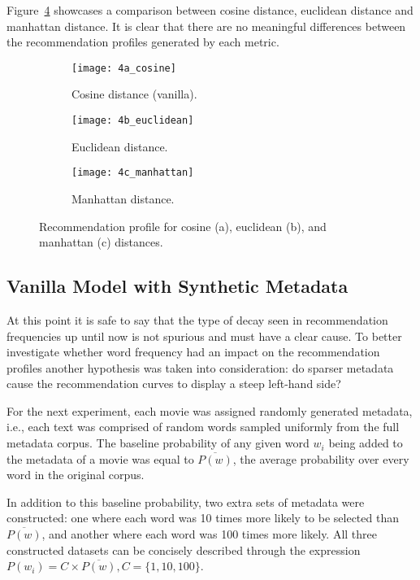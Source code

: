 Figure~\ref{fig:fig4} showcases a comparison between cosine distance, euclidean
distance and manhattan distance. It is clear that there are no meaningful
differences between the recommendation profiles generated by each metric.

\begin{figure}
  \centering
  \begin{subfigure}{0.3\textwidth}
    \centering
    \texttt{[image: 4a\_cosine]}
    \caption{Cosine distance (vanilla).\label{fig:fig4a}}
  \end{subfigure}
  \begin{subfigure}{0.3\textwidth}
    \centering
    \texttt{[image: 4b\_euclidean]}
    \caption{Euclidean distance.\label{fig:fig4b}}
  \end{subfigure}
  \begin{subfigure}{0.3\textwidth}
    \centering
    \texttt{[image: 4c\_manhattan]}
    \caption{Manhattan distance.\label{fig:fig4c}}
  \end{subfigure}
  \caption{Recommendation profile for cosine (a), euclidean (b), and manhattan
    (c) distances.\label{fig:fig4}}
\end{figure}

\subsection{Vanilla Model with Synthetic Metadata}
\label{subsec:synthetic}

At this point it is safe to say that the type of decay seen in recommendation
frequencies up until now is not spurious and must have a clear cause. To better
investigate whether word frequency had an impact on the recommendation profiles
another hypothesis was taken into consideration: do sparser metadata cause the
recommendation curves to display a steep left-hand side?

For the next experiment, each movie was assigned randomly generated metadata,
i.e., each text was comprised of random words sampled uniformly from the full
metadata corpus. The baseline probability of any given word $w_i$ being added to
the metadata of a movie was equal to $\overline{P(w)}$, the average probability
over every word in the original corpus.

In addition to this baseline probability, two extra sets of metadata were
constructed: one where each word was 10 times more likely to be selected than
$\overline{P(w)}$, and another where each word was 100 times more likely. All
three constructed datasets can be concisely described through the expression
$P(w_i) = C \times \overline{P(w)}, C = \{1, 10, 100\}$.

